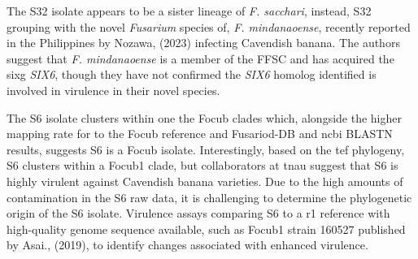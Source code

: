 The S32 isolate appears to be a sister lineage of \textit{F. sacchari}, instead, S32 grouping with the novel \textit{Fusarium} species of, \textit{F. mindanaoense}, recently reported in the Philippines by Nozawa, \et (2023) infecting Cavendish banana. The authors suggest that \textit{F. mindanaoense} is a member of the \ac{FFSC} and has acquired the \ac{sixg} \textit{SIX6}, though they have not confirmed the \textit{SIX6} homolog identified is involved in virulence in their novel species.

The S6 isolate clusters within one the \ac{Focub} clades which, alongside the higher mapping rate for to the \ac{Focub} reference and Fusariod-DB and \ac{ncbi} BLASTN results, suggests S6 is a \ac{Focub} isolate. Interestingly, based on the \ac{tef} phylogeny, S6 clusters within a \ac{Focub1} clade, but collaborators at \ac{tnau} suggest that S6 is highly virulent against Cavendish banana varieties. Due to the high amounts of contamination in the S6 raw data, it is challenging to determine the phylogenetic origin of the S6 isolate. Virulence assays comparing S6 to a \ac{r1} reference with high-quality genome sequence available, such as \ac{Focub1} strain 160527 published by Asai., \et (2019), to identify changes associated with enhanced virulence.

